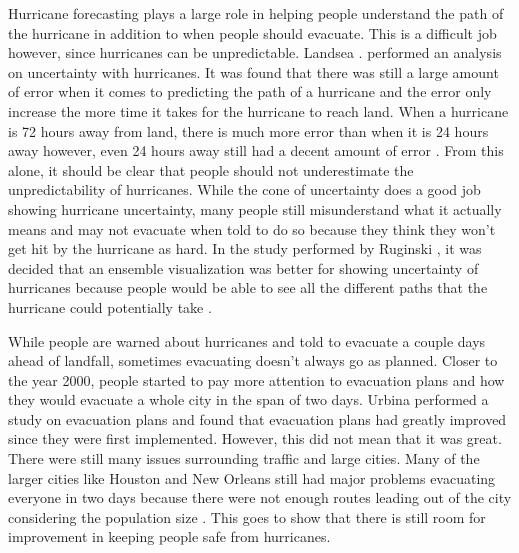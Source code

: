 Hurricane forecasting plays a large role in helping people understand the path of the hurricane in addition to when people should evacuate. This is a difficult job however, since hurricanes can be unpredictable. Landsea \etal. performed an analysis on uncertainty with hurricanes. It was found that there was still a large amount of error when it comes to predicting the path of a hurricane and the error only increase the more time it takes for the hurricane to reach land. When a hurricane is 72 hours away from land, there is much more error than when it is 24 hours away however, even 24 hours away still had a decent amount of error \cite{landsea2013atlantic}. From this alone, it should be clear that people should not underestimate the unpredictability of hurricanes. While the cone of uncertainty does a good job showing hurricane uncertainty, many people still misunderstand what it actually means and may not evacuate when told to do so because they think they won't get hit by the hurricane as hard. In the study performed by Ruginski \etal, it was decided that an ensemble visualization was better for showing uncertainty of hurricanes because people would be able to see all the different paths that the hurricane could potentially take \cite{ruginski2016non}.

While people are warned about hurricanes and told to evacuate a couple days ahead of landfall, sometimes evacuating doesn't always go as planned. Closer to the year 2000, people started to pay more attention to evacuation plans and how they would evacuate a whole city in the span of two days. Urbina \etal performed a study on evacuation plans and found that evacuation plans had greatly improved since they were first implemented. However, this did not mean that it was great. There were still many issues surrounding traffic and large cities. Many of the larger cities like Houston and New Orleans still had major problems evacuating everyone in two days because there were not enough routes leading out of the city considering the population size \cite{urbina2003national}. This goes to show that there is still room for improvement in keeping people safe from hurricanes. 

